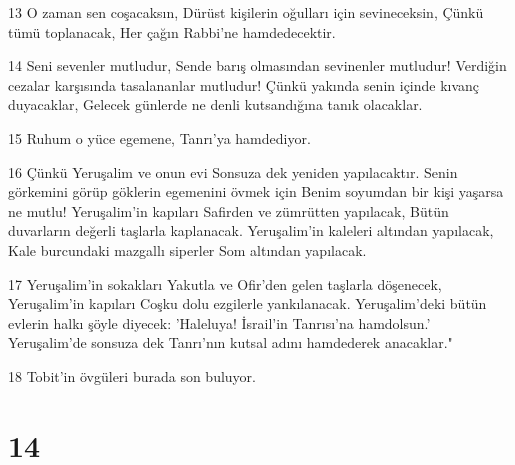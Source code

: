 \par 13 O zaman sen coşacaksın, Dürüst kişilerin oğulları için sevineceksin, Çünkü tümü toplanacak, Her çağın Rabbi'ne hamdedecektir.
\par 14 Seni sevenler mutludur, Sende barış olmasından sevinenler mutludur! Verdiğin cezalar karşısında tasalananlar mutludur! Çünkü yakında senin içinde kıvanç duyacaklar, Gelecek günlerde ne denli kutsandığına tanık olacaklar.
\par 15 Ruhum o yüce egemene, Tanrı'ya hamdediyor.
\par 16 Çünkü Yeruşalim ve onun evi Sonsuza dek yeniden yapılacaktır. Senin görkemini görüp göklerin egemenini övmek için Benim soyumdan bir kişi yaşarsa ne mutlu! Yeruşalim'in kapıları Safirden ve zümrütten yapılacak, Bütün duvarların değerli taşlarla kaplanacak. Yeruşalim'in kaleleri altından yapılacak, Kale burcundaki mazgallı siperler Som altından yapılacak.
\par 17 Yeruşalim'in sokakları Yakutla ve Ofir'den gelen taşlarla döşenecek, Yeruşalim'in kapıları Coşku dolu ezgilerle yankılanacak. Yeruşalim'deki bütün evlerin halkı şöyle diyecek: 'Haleluya! İsrail'in Tanrısı'na hamdolsun.' Yeruşalim'de sonsuza dek Tanrı'nın kutsal adını hamdederek anacaklar."
\par 18 Tobit'in övgüleri burada son buluyor.

\chapter{14}

